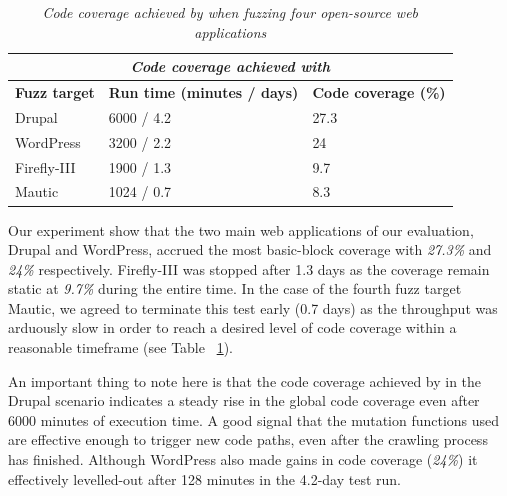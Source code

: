 \begin{table}[ht]
\centering
 \begin{tabular}{@{}|l|l|l|@{}}
 \hline
 \multicolumn{3}{|c|}{\textit{\textbf{Code coverage achieved with \pname{} }}} \\
 \hline
 \textbf{Fuzz target} & \textbf{Run time (minutes / days)} & \textbf{Code coverage (\%)} \\ 
 \hline\hline
 Drupal & 6000 / 4.2 & 27.3 \\ 
 \hline
 WordPress & 3200 / 2.2 & 24 \\ 
 \hline
 Firefly-III & 1900 / 1.3 & 9.7 \\ 
 \hline
 Mautic & 1024 / 0.7 & 8.3 \\ 
 \hline
 \end{tabular}
 \captionsetup{justification=centering}
 \caption[Code coverage achieved by \pname{}]{\textit{Code coverage achieved by \pname{} when fuzzing four open-source web applications}}

 \label{coverage_table}
\end{table}

Our experiment show that the two main web applications of our evaluation, Drupal and WordPress, accrued the most basic-block coverage with \emph{27.3\%} and \emph{24\%} respectively. Firefly-III was stopped after 1.3 days as the coverage remain static at \emph{9.7\%} during the entire time. In the case of the fourth fuzz target Mautic, we agreed to terminate this test early (0.7 days) as the throughput was arduously slow in order to reach a desired level of code coverage within a reasonable timeframe (see Table ~\ref{coverage_table}). 

An important thing to note here is that the code coverage achieved by \pname{} in the Drupal scenario indicates a steady rise in the global code coverage even after 6000 minutes of execution time. A good signal that the mutation functions used are effective enough to trigger new code paths, even after the crawling process has finished. Although WordPress also made gains in code coverage (\emph{24\%}) it effectively levelled-out after 128 minutes in the 4.2-day test run.
 
